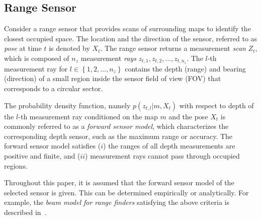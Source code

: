 \documentclass[letterpaper, 10pt, conference]{ieeeconf}
\newcommand{\braces}[1]{\ensuremath{\left\{ #1 \right\}}}
\begin{document}
\subsection{Range Sensor}

Consider a range sensor that provides scans of surrounding maps to identify the closest occupied space. The location and the direction of the sensor, referred to as \emph{pose} at time $t$ is denoted by $X_t$. The range sensor returns a measurement \emph{scan} $Z_t$, which is composed of $n_z$ measurement \emph{rays} $z_{t,1},z_{t,2},...,z_{t,n_z}$. The $l$-th measurement ray for $l\in\braces{1,2,...,n_z}$ contains the depth (range) and bearing (direction) of a small region inside the sensor field of view (FOV) that corresponds to a circular sector.

The probability density function, namely $p(z_{t,l}|m,X_t)$ with respect to depth of the $l$-th measurement ray conditioned on the map $m$ and the pose $X_t$ is commonly referred to as a \emph{forward sensor model}, which characterizes the corresponding depth sensor, such as the maximum range or accuracy. The forward sensor model satisfies  ($i$) the ranges of all depth measurements are positive and finite, and ($ii$) measurement rays cannot pass through occupied regions.

Throughout this paper, it is assumed that the forward sensor model of the selected sensor is given. This can be determined empirically or analytically. For example, the \emph{beam model for range finders} satisfying  the above criteria is described in~\cite{ThrBurFox05}.
\end{document}
